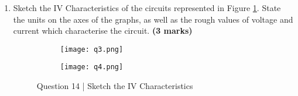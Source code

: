 \begin{enumerate}












\item Sketch the IV Characteristics of the circuits represented in Figure \ref{IVChar}. State the units on the axes of the graphs, as well as the rough values of voltage and current which characterise the circuit. \hfill \textbf{(3 marks)}

\begin{figure}[!htb]
\centering \hfill
\begin{subfigure}[b]{0.5\textwidth}
\centering
\texttt{[image: q3.png]}
\end{subfigure}\hfill
\begin{subfigure}[b]{0.5\textwidth}
\centering
\texttt{[image: q4.png]}
\end{subfigure}%
\hfill
\caption{Question 14 | Sketch the IV Characteristics}
\label{IVChar}
\end{figure}




\end{enumerate}
